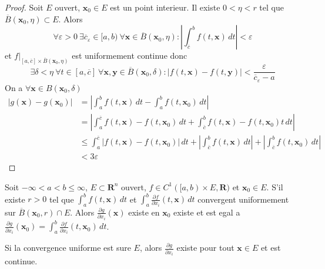 \begin{proof}
Soit $E$ ouvert, $\boldsymbol{x}_{0}\in E$ est un point interieur. Il existe $0<\eta<r$ tel que $\overline{B}(\boldsymbol{x}_{0},\eta)\subset E$. Alors
$$
	\forall\varepsilon>0~\exists  \overline{c}_{\varepsilon}\in[a,b)~\forall \boldsymbol{x}\in \overline{B}(\boldsymbol{x}_{0},\eta): \left\lvert  \int_{\overline{c}}^{b}f(t,\boldsymbol{x})  \, dt   \right\rvert <\varepsilon
$$
et $f|_{[a,\overline{c}]\times \overline{B}(\boldsymbol{x}_{0},\eta)}$ est uniformement continue donc 
$$
\exists\delta<\eta~\forall t\in[a,\overline{c}]~\forall \boldsymbol{x},\boldsymbol{y}\in \overline{B}(\boldsymbol{x}_{0},\delta):\lvert f(t,\boldsymbol{x})-f(t,\boldsymbol{y}) \rvert <\frac{\varepsilon}{\overline{c}_{\varepsilon}-a}
$$
On a $\forall \boldsymbol{x}\in B(\boldsymbol{x}_{0},\delta)$ 
\begin{align*}
\lvert g(\boldsymbol{x})-g(\boldsymbol{x}_{0}) \rvert  & =\left\lvert  \int_{a}^{b} f(t,\boldsymbol{x})\, dt -\int_{a}^{b} f(t,\boldsymbol{x}_{0}) \, dt    \right\rvert  \\
 & =\left\lvert  \int_{a}^{\overline{c}} f(t,\boldsymbol{x})-f(t,\boldsymbol{x}_{0}) \, dt    +  \int_{\overline{c}}^{b} f(t,\boldsymbol{x})-f(t,\boldsymbol{x}_{0})t \, dt   \right\rvert  \\
  & \le \int_{a}^{\overline{c}} \lvert f(t,\boldsymbol{x})-f(t,\boldsymbol{x}_{0}) \rvert  \, dt+\left\lvert  \int_{\overline{c}}^{b} f(t,\boldsymbol{x})   \, dt   \right\rvert+\left\lvert  \int_{\overline{c}}^{b} f(t,\boldsymbol{x}_{0}) \, dt   \right\rvert \\
 & <3\varepsilon
\end{align*}
\end{proof}

\begin{theorem}
Soit $-\infty<a<b \le \infty$, $E\subset \mathbf{R}^{n}$ ouvert, $f\in C^{1}([a,b)\times E,\mathbf{R})$ et $\boldsymbol{x}_{0}\in E$. S'il existe $r>0$ tel que $\int_{a}^{b} f(t,\boldsymbol{x}) \, dt$ et $\int_{a}^{b} \frac{ \partial f }{ \partial x_{i} }(t,\boldsymbol{x}) \, dt$ convergent uniformement sur $\overline{B}(\boldsymbol{x}_{0},r)\cap E$. Alors $\frac{ \partial g }{ \partial x_{i} }(\boldsymbol{x})$ existe en $\boldsymbol{x}_{0}$ existe et est egal a $\frac{ \partial g }{ \partial x_{i} }(\boldsymbol{x}_{0})=\int_{a}^{b} \frac{ \partial f }{ \partial x_{i} }(t,\boldsymbol{x}_{0}) \, dt$. 

Si la convergence uniforme est sure $E$, alors $\frac{ \partial g }{ \partial x_{i} }$ existe pour tout $\boldsymbol{x}\in E$ et est continue.
\end{theorem}
